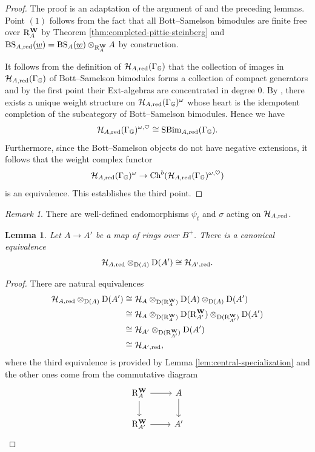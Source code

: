 \documentclass[a4paper, 10pt, oneside, reqno]{amsart}
\theoremstyle{plain}
\newtheorem{lem}[thm]{Lemma}
\theoremstyle{definition}
\theoremstyle{remark}
\newtheorem{rque}[thm]{Remark}
\newcommand{\Gbb}{\mathbb{G}}
\newcommand{\RR}{\mathrm{R}}
\newcommand{\BS}{\mathrm{BS}}
\begin{document}
\begin{proof}
The proof is an adaptation of the argument of \cite[Corollary 4.14]{EteveEberhardt} and the preceding lemmas. 
Point $(1)$ follows from the fact that all Bott--Samelson bimodules are finite free over $\RR_A^{\Wbf}$ by Theorem \ref{thm:completed-pittie-steinberg} and $\BS_{A,\red}(\underline{w}) = \BS_{A}(\underline{w}) \otimes_{\RR_A^{\Wbf}} A$ by construction. 

It follows from the definition of $\Hcal_{A, \red}(\Gamma_{\Gbb})$ that the collection of images in $\Hcal_{A, \red}(\Gamma_{\Gbb})$ of Bott--Samelson bimodules forms a collection of compact generators and by the first point their Ext-algebras are concentrated in degree $0$. By \cite[Theorem 4.3.2]{Bondarko}, there exists a unique weight structure on $\Hcal_{A,\red}(\Gamma_{\Gbb})^{\omega}$ whose heart is the idempotent completion of the subcategory of Bott--Samelson bimodules. Hence we have 
$$\Hcal_{A,\red}(\Gamma_{\Gbb})^{\omega, \heartsuit} \cong \SBim_{A,\red}(\Gamma_{\Gbb}).$$
Furthermore, since the Bott--Samelson objects do not have negative extensions, it follows that the weight complex functor 
$$\Hcal_{A,\red}(\Gamma_{\Gbb})^{\omega} \to \Ch^b(\Hcal_{A,\red}(\Gamma_{\Gbb})^{\omega, \heartsuit})$$
is an equivalence. 
This establishes the third point. 
\end{proof}

\begin{rque}
There are well-defined endomorphisms $\psi_t$ and $\sigma$ acting on $\mathcal{H}_{A, \mathrm{red}}$. 
\end{rque}

\begin{lem}\label{lem:base-change-for-reduced-hecke-cat}
Let $A \to A'$ be a map of rings over $B^+$. There is a canonical equivalence 
$$\mathcal{H}_{A,\mathrm{red}} \otimes_{\mathrm{D}(A)} \mathrm{D}(A') \cong \mathcal{H}_{A',\mathrm{red}}.$$
\end{lem}

\begin{proof}
There are natural equivalences 
\begin{align*}
\Hcal_{A, \red} \otimes_{\DD(A)} \DD(A') &\cong \Hcal_{A} \otimes_{\DD(\RR_A^{\Wbf})} \DD(A) \otimes_{\DD(A)} \DD(A') \\
&\cong \Hcal_{A} \otimes_{\DD(\RR_A^{\Wbf})} \DD(\RR^{\Wbf}_{A'}) \otimes_{\DD(\RR^{\Wbf}_{A'})} \DD(A') \\
&\cong \Hcal_{A'} \otimes_{\DD(\RR^{\Wbf}_{A'})} \DD(A') \\
&\cong \Hcal_{A',\red},
\end{align*}
where the third equivalence is provided by Lemma \ref{lem:central-specialization} and the other ones come from the commutative diagram 
\[\begin{tikzcd}
	{\RR_{A}^{\Wbf}} & A \\
	{\RR_{A'}^{\Wbf}} & {A'}
	\arrow[from=1-1, to=1-2]
	\arrow[from=1-1, to=2-1]
	\arrow[from=1-2, to=2-2]
	\arrow[from=2-1, to=2-2]
\end{tikzcd}\]
\end{proof}
\end{document}
